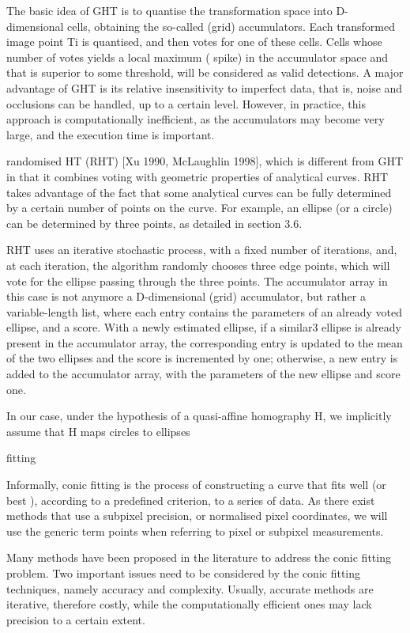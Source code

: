 \documentclass[a4paper]{report}
\begin{document}
The
basic idea of GHT is to quantise the transformation space into D-dimensional cells, obtaining
the so-called (grid) accumulators. Each transformed image point Ti is quantised, and then
votes for one of these cells. Cells whose number of votes yields a local maximum ( spike) in the
accumulator space and that is superior to some threshold, will be considered as valid detections.
A major advantage of GHT is its relative insensitivity to imperfect data, that is, noise
and occlusions can be handled, up to a certain level. However, in practice, this approach is
computationally inefficient, as the accumulators may become very large, and the execution
time is important.

randomised HT (RHT) [Xu 1990, McLaughlin 1998],
which is different from GHT in that it combines voting with geometric properties of analytical
curves. RHT takes advantage of the fact that some analytical curves can be fully determined by
a certain number of points on the curve. For example, an ellipse (or a circle) can be determined
by three points, as detailed in section 3.6.

RHT uses an iterative stochastic process, with a
fixed number of iterations, and, at each iteration, the algorithm randomly chooses three edge
points, which will vote for the ellipse passing through the three points. The accumulator array
in this case is not anymore a D-dimensional (grid) accumulator, but rather a variable-length
list, where each entry contains the parameters of an already voted ellipse, and a score. With
a newly estimated ellipse, if a similar3 ellipse is already present in the accumulator array, the
corresponding entry is updated to the mean of the two ellipses and the score is incremented by
one; otherwise, a new entry is added to the accumulator array, with the parameters of the new
ellipse and score one.

In our case, under the hypothesis of a
quasi-affine homography H, we implicitly assume that H maps circles to ellipses


fitting

Informally, conic fitting is the process of constructing a curve that fits well (or best ), according
to a predefined criterion, to a series of data.
As there exist methods that
use a subpixel precision, or normalised pixel coordinates, we will use the generic term points
when referring to pixel or subpixel measurements.

Many methods have been proposed in the literature to address the conic fitting problem. Two
important issues need to be considered by the conic fitting techniques, namely accuracy and
complexity. Usually, accurate methods are iterative, therefore costly, while the computationally
efficient ones may lack precision to a certain extent.
\end{document}
